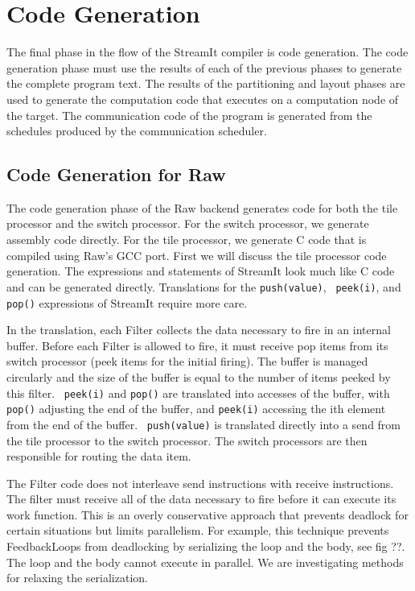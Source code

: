 \section{Code Generation}
\label{sec:codegen}

The final phase in the flow of the StreamIt compiler is code
generation.  The code generation phase must use the results of each of
the previous phases to generate the complete program text.  The
results of the partitioning and layout phases are used to generate the
computation code that executes on a computation node of the target.
The communication code of the program is generated from the schedules
produced by the communication scheduler.


\subsection{Code Generation for Raw}

The code generation phase of the Raw backend generates code for both
the tile processor and the switch processor.  For the switch
processor, we generate assembly code directly.  For the tile
processor, we generate C code that is compiled using Raw's GCC port.
First we will discuss the tile processor code generation.  The
expressions and statements of StreamIt look much like C code and can
be generated directly.  Translations for the {\tt push(value)}, {\tt
peek(i)}, and {\tt pop()} expressions of StreamIt require more care.

In the translation, each Filter collects the data necessary to fire in
an internal buffer.  Before each Filter is allowed to fire, it must
receive pop items from its switch processor (peek items for the
initial firing).  The buffer is managed circularly and the size of the
buffer is equal to the number of items peeked by this filter.  {\tt
peek(i)} and {\tt pop()} are translated into accesses of the buffer,
with {\tt pop()} adjusting the end of the buffer, and {\tt peek(i)}
accessing the ith element from the end of the buffer.  {\tt
push(value)} is translated directly into a send from the tile
processor to the switch processor.  The switch processors are then
responsible for routing the data item.

The Filter code does not interleave send instructions with receive
instructions.  The filter must receive all of the data necessary to
fire before it can execute its work function.  This is an overly
conservative approach that prevents deadlock for certain situations
but limits parallelism.  For example, this technique prevents
FeedbackLoops from deadlocking by serializing the loop and the body,
see fig ??.  The loop and the body cannot execute in parallel.  We are
investigating methods for relaxing the serialization.

